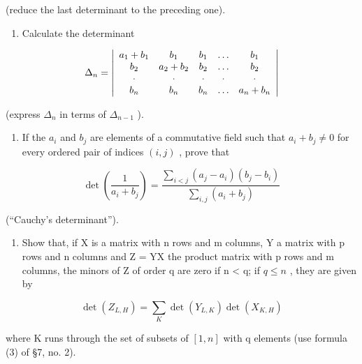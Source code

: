 (reduce the last determinant to the preceding one).

\begin{enumerate}
\def\labelenumi{\arabic{enumi}.}
\setcounter{enumi}{3}
\tightlist
\item
  Calculate the determinant
\end{enumerate}

\[
\Delta_ {n} = \left| \begin{array}{c c c c c} a _ {1} + b _ {1} & b _ {1} & b _ {1} & \ldots & b _ {1} \\ b _ {2} & a _ {2} + b _ {2} & b _ {2} & \ldots & b _ {2} \\ \cdot & \cdot & \cdot & \cdot & \cdot \\ b _ {n} & b _ {n} & b _ {n} & \ldots & a _ {n} + b _ {n} \end{array} \right|
\]

(express \(\Delta_{n}\) in terms of \(\Delta_{n-1}\) ).

\begin{enumerate}
\def\labelenumi{\arabic{enumi}.}
\setcounter{enumi}{4}
\tightlist
\item
  If the \(a_i\) and \(b_j\) are elements of a commutative field such that \(a_i + b_j \neq 0\) for every ordered pair of indices \((i,j)\) , prove that
\end{enumerate}

\[
\det \left(\frac {1}{a _ {i} + b _ {j}}\right) = \frac {\sum_ {i <   j} (a _ {j} - a _ {i}) (b _ {j} - b _ {i})}{\sum_ {i , j} (a _ {i} + b _ {j})}
\]

(``Cauchy's determinant'').

\begin{enumerate}
\def\labelenumi{\arabic{enumi}.}
\setcounter{enumi}{5}
\tightlist
\item
  Show that, if X is a matrix with n rows and m columns, Y a matrix with p rows and n columns and Z = YX the product matrix with p rows and m columns, the minors of Z of order q are zero if n \textless{} q; if \(q \leqslant n\) , they are given by
\end{enumerate}

\[
\det (Z _ {L, H}) = \sum_ {K} \det (Y _ {L, K}) \det (X _ {K, H})
\]

where K runs through the set of subsets of \([1, n]\) with q elements (use formula (3) of §7, no. 2).

